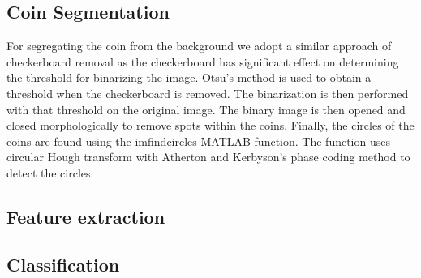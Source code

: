 \documentclass[report.tex]{subfile}
\begin{document}
\subsection{Coin Segmentation}
For segregating the coin from the background we adopt a similar approach of
checkerboard removal as the checkerboard has significant effect on determining
the threshold for binarizing the image. Otsu's method is used to obtain a
threshold when the checkerboard is removed. The binarization is then performed
with that threshold on the original image. The binary image is then opened and
closed morphologically to remove spots within the coins. Finally, the circles
of the coins are found using the imfindcircles MATLAB function. The function
uses circular Hough transform with Atherton and Kerbyson's phase coding method
to detect the circles.\cite{matlab-imfindcircles}

\subsection{Feature extraction}

\subsection{Classification}
\end{document}
